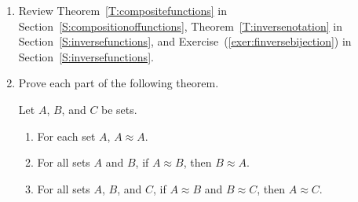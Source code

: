 \begin{previewactivity}\label{PA:equivsets2} \hfill
\begin{enumerate}
\item Review Theorem~\ref{T:compositefunctions} in Section~\ref{S:compositionoffunctions}, Theorem~\ref{T:inversenotation} in Section~\ref{S:inversefunctions}, and 
Exercise~(\ref{exer:finversebijection}) in Section~\ref{S:inversefunctions}.


\item Prove each part of the following theorem.
\begin{theorem} \label{T:equivsets} Let $A$, $B$, and $C$ be sets.

\begin{enumerate}
\item For each set $A$, $A \approx A$.  \label{T:equivsets1}

\item For all sets $A$ and $B$, if $A \approx B$, then 
$B \approx A$.  \label{T:equivsets2}

\item For all sets $A$, $B$, and $C$, if $A \approx B$ and 
$B \approx C$, then $A \approx C$.  \label{T:equivsets3}
\end{enumerate}
\end{theorem}
\end{enumerate}
\end{previewactivity}
\hbreak

\endinput
